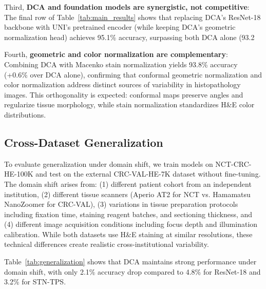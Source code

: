 \documentclass[final,3p,times,review,sort&compress]{elsarticle}
\begin{document}
Third, \textbf{DCA and foundation models are synergistic, not competitive}: The final row of Table~\ref{tab:main_results} shows that replacing DCA's ResNet-18 backbone with UNI's pretrained encoder (while keeping DCA's geometric normalization head) achieves 95.1\% accuracy, surpassing both DCA alone (93.2%

Fourth, \textbf{geometric and color normalization are complementary}: Combining DCA with Macenko stain normalization yields 93.8\% accuracy (+0.6\% over DCA alone), confirming that conformal geometric normalization and color normalization address distinct sources of variability in histopathology images. This orthogonality is expected: conformal maps preserve angles and regularize tissue morphology, while stain normalization standardizes H\&E color distributions.

\subsection{Cross-Dataset Generalization}

To evaluate generalization under domain shift, we train models on NCT-CRC-HE-100K and test on the external CRC-VAL-HE-7K dataset without fine-tuning. The domain shift arises from: (1) different patient cohort from an independent institution, (2) different tissue scanners (Aperio AT2 for NCT vs. Hamamatsu NanoZoomer for CRC-VAL), (3) variations in tissue preparation protocols including fixation time, staining reagent batches, and sectioning thickness, and (4) different image acquisition conditions including focus depth and illumination calibration. While both datasets use H\&E staining at similar resolutions, these technical differences create realistic cross-institutional variability.

Table~\ref{tab:generalization} shows that DCA maintains strong performance under domain shift, with only 2.1\% accuracy drop compared to 4.8\% for ResNet-18 and 3.2\% for STN-TPS.
\end{document}

